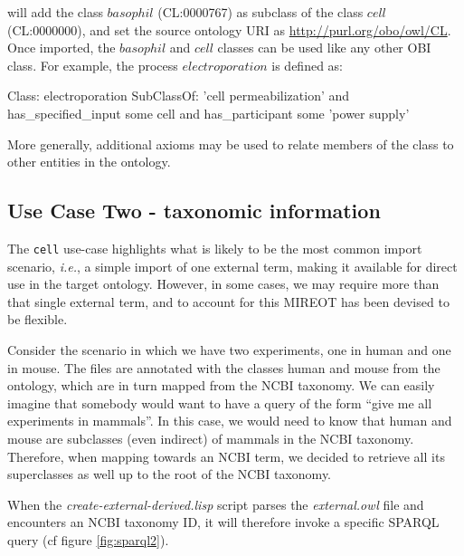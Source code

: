 \documentclass[jou]{ao2e}%
\begin{document}
will add the class $basophil$ (CL:0000767) as subclass of the class $cell$  (CL:0000000), and set the source ontology URI as \url{http://purl.org/obo/owl/CL}.
Once imported, the $basophil$ and $cell$ classes can be used like any other OBI class. For example, the process $electroporation$ is defined as:

\begin{footnotesize}
\begin{verbatimtab}
Class: electroporation
      SubClassOf: 'cell permeabilization'
                              and has_specified_input some cell
                              and has_participant some 'power supply'
\end{verbatimtab}
\end{footnotesize}

More generally, additional axioms may be used to relate members of the class to other entities in the ontology.


\subsection*{Use Case Two - taxonomic information}

The \texttt{cell} use-case highlights what is likely to be the most common import scenario, \emph{i.e.}, a simple import of one external term, making it available for direct use in the target ontology.
However, in some cases, we may require more than that single external term, and to account for this \ac{MIREOT} has been devised to be flexible.

Consider the scenario in which we have two experiments, one in human and one in mouse. 
The files are annotated with the classes human and mouse from the ontology, which are in turn mapped from the NCBI taxonomy. 
We can easily imagine that somebody would want to have a query of the form ``give me all 
experiments in mammals''. In this case, we would need to know that human and mouse are 
subclasses (even indirect) of mammals in the NCBI taxonomy. Therefore, when mapping 
towards an NCBI term, we decided to retrieve all its superclasses as well up to the root of the 
NCBI taxonomy.

When the \emph{create-external-derived.lisp} script parses the \emph{external.owl} file and encounters an NCBI taxonomy ID, it will therefore invoke a specific SPARQL query (cf figure \ref{fig:sparql2}). 
\end{document}
